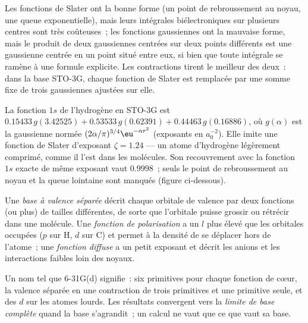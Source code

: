 Les fonctions de Slater ont la bonne forme (un point de rebroussement au
noyau, une queue exponentielle), mais leurs intégrales biélectroniques
sur plusieurs centres sont très coûteuses~; les fonctions gaussiennes
ont la mauvaise forme, mais le produit de deux gaussiennes centrées sur
deux points différents est une gaussienne centrée en un point situé entre
eux, si bien que toute intégrale se ramène à une formule explicite. Les
contractions tirent le meilleur des deux~: dans la base STO-3G, chaque
fonction de Slater est remplacée par une somme fixe de trois gaussiennes
ajustées sur elle.

\begin{example}\label{ex:b3:computational-chemistry:sto3g}
La fonction $1s$ de l'hydrogène en STO-3G est $0.15433\,g(3.42525) + 0.53533\,
g(0.62391) + 0.44463\,g(0.16886)$, où $g(\alpha)$ est la gaussienne normée
$(2\alpha/\pi)^{3/4}\eu^{-\alpha r^2}$ (exposants en $a_0^{-2}$). Elle imite
une fonction de Slater d'exposant $\zeta = 1.24$ --- un atome
d'hydrogène légèrement comprimé, comme il l'est dans les molécules. Son
recouvrement avec la fonction $1s$ exacte de même exposant vaut
$0.9998$~; seuls le point de rebroussement au noyau et la queue lointaine
sont manqués (figure ci-dessous).
\end{example}

\begin{definition}\label{def:b3:computational-chemistry:split-valence}
Une \emph{base à valence séparée} décrit chaque orbitale
de valence par deux fonctions (ou plus) de tailles différentes, de sorte
que l'orbitale puisse grossir ou rétrécir dans une molécule. Une
\emph{fonction de polarisation} a un $l$
plus élevé que les orbitales occupées ($p$ sur H, $d$ sur C) et permet à
la densité de se déplacer hors de l'atome~; une
\emph{fonction diffuse} a un petit exposant et
décrit les anions et les interactions faibles loin des noyaux.
\end{definition}

Un nom tel que 6-31G(d) signifie~: six primitives pour chaque fonction de
cœur, la valence séparée en une contraction de trois primitives et une
primitive seule, et des  $d$ sur les atomes
lourds. Les résultats convergent vers la \emph{limite de base complète}
quand la base s'agrandit~; un calcul ne vaut que ce que vaut sa base.

